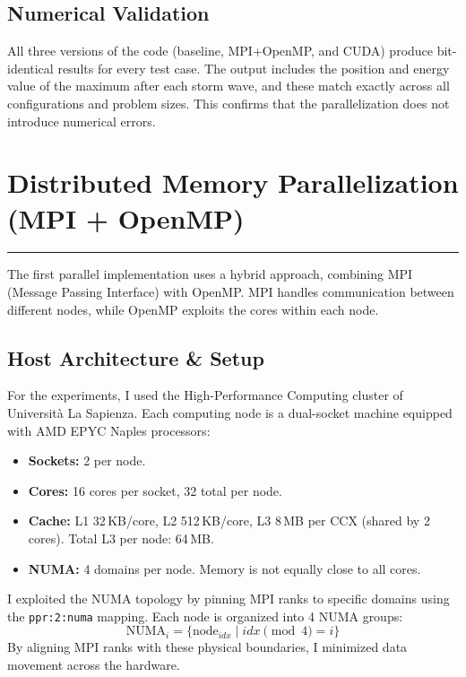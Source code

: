 \documentclass[10pt,dvipsnames,table,twocolumn]{article}
\newcommand{\sectionrule}{\vspace{0.2em}\noindent\textcolor{PaleInk}{\rule{\columnwidth}{0.4pt}}\vspace{0.3em}}
\let\oldsection\section
\renewcommand{\section}[1]{\oldsection{#1}\sectionrule}
\let\oldtexttt\texttt
\renewcommand{\texttt}[1]{%
  {\small\colorbox{Mist}{\oldtexttt{\textcolor{DarkInk}{#1}}}}%
}
\begin{document}
\subsection{Numerical Validation}

All three versions of the code (baseline, MPI+OpenMP, and CUDA) produce bit-identical results for every test case. The output includes the position and energy value of the maximum after each storm wave, and these match exactly across all configurations and problem sizes. This confirms that the parallelization does not introduce numerical errors.


\section{Distributed Memory Parallelization (MPI + OpenMP)}\label{sec:mpi}

The first parallel implementation uses a hybrid approach, combining MPI (Message Passing Interface) with OpenMP. MPI handles communication between different nodes, while OpenMP exploits the cores within each node.

\subsection{Host Architecture \& Setup}

For the experiments, I used the High-Performance Computing cluster of Universit\`a La Sapienza. Each computing node is a dual-socket machine equipped with AMD EPYC Naples processors:

\begin{itemize}
  \item \textbf{Sockets:} 2 per node.
  \item \textbf{Cores:} 16 cores per socket, 32 total per node.
  \item \textbf{Cache:} L1 32\,KB/core, L2 512\,KB/core, L3 8\,MB per CCX (shared by 2 cores). Total L3 per node: 64\,MB.
  \item \textbf{NUMA:} 4 domains per node. Memory is not equally close to all cores.
\end{itemize}

I exploited the NUMA topology by pinning MPI ranks to specific domains using the \texttt{ppr:2:numa} mapping. Each node is organized into 4 NUMA groups:
\begin{equation}
\text{NUMA}_i = \{ \text{node}_{idx} \;|\; idx \pmod{4} = i \}
\end{equation}
By aligning MPI ranks with these physical boundaries, I minimized data movement across the hardware.
\end{document}
